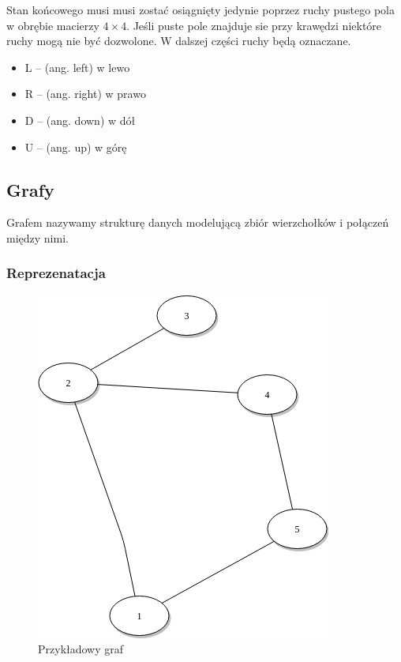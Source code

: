 \documentclass{classrep}
\begin{document}
Stan końcowego musi musi zostać osiągnięty jedynie poprzez ruchy pustego pola w obrębie macierzy $4\times 4$. 
Jeśli puste pole znajduje sie przy krawędzi niektóre ruchy mogą nie być dozwolone.
W dalszej części ruchy będą oznaczane.
\begin{itemize}
    \item L -- (ang. left) w lewo
    \item R -- (ang. right) w prawo
    \item D -- (ang. down) w dół
    \item U -- (ang. up) w górę
\end{itemize}

\subsection{Grafy}
Grafem nazywamy strukturę danych modelującą zbiór wierzchołków i połączeń między nimi.
\subsubsection{Reprezenatacja}
\begin{figure}[h]
    \includegraphics[scale = 0.4]{graf.png}
    \caption{Przykładowy graf}
\end{figure}
\end{document}
